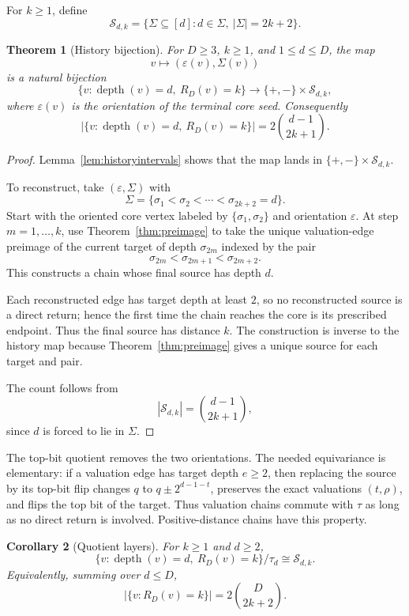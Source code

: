 \documentclass[11pt]{article}
\newtheorem{theorem}{Theorem}[section]
\newtheorem{corollary}[theorem]{Corollary}
\theoremstyle{definition}
\theoremstyle{remark}
\newcommand{\depth}{\operatorname{depth}}
\newcommand{\Sfam}{\mathcal S}
\newcommand{\eps}{\varepsilon}
\begin{document}
For $k\ge1$, define
\[
\Sfam_{d,k}=\{\Sigma\subseteq[d]:d\in\Sigma,\ |\Sigma|=2k+2\}.
\]

\begin{theorem}[History bijection]\label{thm:bijection}
For $D\ge3$, $k\ge1$, and $1\le d\le D$, the map
\[
v\longmapsto (\eps(v),\Sigma(v))
\]
is a natural bijection
\[
\{v:\depth(v)=d,\ R_D(v)=k\}
\longrightarrow
\{+,-\}\times\Sfam_{d,k},
\]
where $\eps(v)$ is the orientation of the terminal core seed.  Consequently
\[
\bigl|\{v:\depth(v)=d,\ R_D(v)=k\}\bigr|=2\binom{d-1}{2k+1}.
\]
\end{theorem}

\begin{proof}
Lemma~\ref{lem:historyintervals} shows that the map lands in $\{+,-\}\times\Sfam_{d,k}$.

To reconstruct, take $(\eps,\Sigma)$ with
\[
\Sigma=\{\sigma_1<\sigma_2<\cdots<\sigma_{2k+2}=d\}.
\]
Start with the oriented core vertex labeled by $\{\sigma_1,\sigma_2\}$ and orientation $\eps$.  At step $m=1,\ldots,k$, use Theorem~\ref{thm:preimage} to take the unique valuation-edge preimage of the current target of depth $\sigma_{2m}$ indexed by the pair
\[
\sigma_{2m}<\sigma_{2m+1}<\sigma_{2m+2}.
\]
This constructs a chain whose final source has depth $d$.

Each reconstructed edge has target depth at least $2$, so no reconstructed source is a direct return; hence the first time the chain reaches the core is its prescribed endpoint.  Thus the final source has distance $k$.  The construction is inverse to the history map because Theorem~\ref{thm:preimage} gives a unique source for each target and pair.

The count follows from
\[
|\Sfam_{d,k}|=\binom{d-1}{2k+1},
\]
since $d$ is forced to lie in $\Sigma$.
\end{proof}

The top-bit quotient removes the two orientations.  The needed equivariance is elementary: if a valuation edge has target depth $e\ge2$, then replacing the source by its top-bit flip changes $q$ to $q\pm2^{d-1-t}$, preserves the exact valuations $(t,\rho)$, and flips the top bit of the target.  Thus valuation chains commute with $\tau$ as long as no direct return is involved.  Positive-distance chains have this property.

\begin{corollary}[Quotient layers]\label{cor:quotient}
For $k\ge1$ and $d\ge2$,
\[
\{v:\depth(v)=d,\ R_D(v)=k\}/\tau_d
\cong
\Sfam_{d,k}.
\]
Equivalently, summing over $d\le D$,
\[
\bigl|\{v:R_D(v)=k\}\bigr|=2\binom{D}{2k+2}.
\]
\end{corollary}
\end{document}
